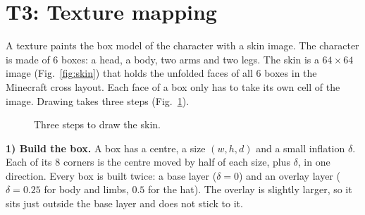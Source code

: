 \documentclass[9pt,twocolumn,a4paper]{extarticle}
\newcommand{\code}[1]{\texttt{#1}}
\begin{document}
\par\noindent{}\par\vspace{3pt}



\section{T3: Texture mapping}
\label{chap:t3}
A texture paints the box model of the character with a skin image. The character is made of 6 boxes: a head, a body, two arms and two legs. The skin is a $64\times64$ image (Fig.~\ref{fig:skin}) that holds the unfolded faces of all 6 boxes in the Minecraft cross layout. Each face of a box only has to take its own cell of the image. Drawing takes three steps (Fig.~\ref{fig:skinflow}).

\begin{figure}[H]
\centering
{}
\caption{Three steps to draw the skin.}
\label{fig:skinflow}
\end{figure}

\textbf{1) Build the box.} A box has a centre, a size $(w,h,d)$ and a small inflation $\delta$. Each of its 8 corners is the centre moved by half of each size, plus $\delta$, in one direction.
Every box is built twice: a base layer ($\delta=0$) and an overlay layer ($\delta=0.25$ for body and limbs, $0.5$ for the hat). The overlay is slightly larger, so it sits just outside the base layer and does not stick to it.

\par\noindent{}\par\vspace{3pt}
\end{document}
